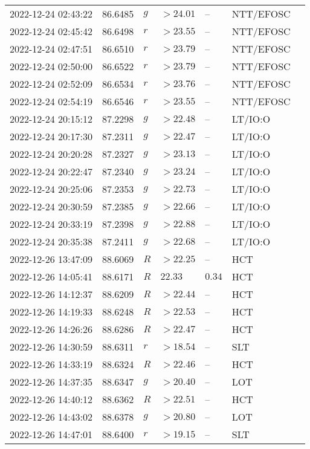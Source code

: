 \documentclass{nature_plusfigure}
\begin{document}
\begin{supplement}
\begin{center}
\begin{longtable}{lllllll}
2022-12-24 02:43:22 & 86.6485 & $g$ & $>24.01$ & -- & NTT/EFOSC &  \\ 
2022-12-24 02:45:42 & 86.6498 & $r$ & $>23.55$ & -- & NTT/EFOSC &  \\ 
2022-12-24 02:47:51 & 86.6510 & $r$ & $>23.79$ & -- & NTT/EFOSC &  \\ 
2022-12-24 02:50:00 & 86.6522 & $r$ & $>23.79$ & -- & NTT/EFOSC &  \\ 
2022-12-24 02:52:09 & 86.6534 & $r$ & $>23.76$ & -- & NTT/EFOSC &  \\ 
2022-12-24 02:54:19 & 86.6546 & $r$ & $>23.55$ & -- & NTT/EFOSC &  \\ 
2022-12-24 20:15:12 & 87.2298 & $g$ & $>22.48$ & -- & LT/IO:O &  \\ 
2022-12-24 20:17:30 & 87.2311 & $g$ & $>22.47$ & -- & LT/IO:O &  \\ 
2022-12-24 20:20:28 & 87.2327 & $g$ & $>23.13$ & -- & LT/IO:O &  \\ 
2022-12-24 20:22:47 & 87.2340 & $g$ & $>23.24$ & -- & LT/IO:O &  \\ 
2022-12-24 20:25:06 & 87.2353 & $g$ & $>22.73$ & -- & LT/IO:O &  \\ 
2022-12-24 20:30:59 & 87.2385 & $g$ & $>22.66$ & -- & LT/IO:O &  \\ 
2022-12-24 20:33:19 & 87.2398 & $g$ & $>22.88$ & -- & LT/IO:O &  \\ 
2022-12-24 20:35:38 & 87.2411 & $g$ & $>22.68$ & -- & LT/IO:O &  \\ 
2022-12-26 13:47:09 & 88.6069 & $R$ & $>22.25$ & -- & HCT &  \\ 
2022-12-26 14:05:41 & 88.6171 & $R$ & $22.33$ & $0.34$ & HCT &  \\ 
2022-12-26 14:12:37 & 88.6209 & $R$ & $>22.44$ & -- & HCT &  \\ 
2022-12-26 14:19:33 & 88.6248 & $R$ & $>22.53$ & -- & HCT &  \\ 
2022-12-26 14:26:26 & 88.6286 & $R$ & $>22.47$ & -- & HCT &  \\ 
2022-12-26 14:30:59 & 88.6311 & $r$ & $>18.54$ & -- & SLT &  \\ 
2022-12-26 14:33:19 & 88.6324 & $R$ & $>22.46$ & -- & HCT &  \\ 
2022-12-26 14:37:35 & 88.6347 & $g$ & $>20.40$ & -- & LOT &  \\ 
2022-12-26 14:40:12 & 88.6362 & $R$ & $>22.51$ & -- & HCT &  \\ 
2022-12-26 14:43:02 & 88.6378 & $g$ & $>20.80$ & -- & LOT &  \\ 
2022-12-26 14:47:01 & 88.6400 & $r$ & $>19.15$ & -- & SLT &  \\ 

\end{longtable}
\end{center}
\end{supplement}
\end{document}
